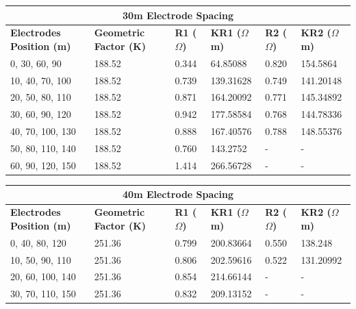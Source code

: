 \documentclass[12pt,a4paper]{report}
\begin{document}
\begin{table}[H]
    \centering
    \begin{adjustbox}{max width=\textwidth}
    \setlength{\tabcolsep}{15pt}
    \renewcommand{\arraystretch}{1.5}
    \begin{tabular}{|p{3.0cm}|p{2.5cm}|p{1.8cm}|p{2.5cm}|p{2cm}|p{3.0cm}|}
    \hline
    \multicolumn{6}{|c|}{\rule{0pt}{2em}\huge\textbf{30m Electrode Spacing}} \\
    \hline
    \textbf{Electrodes Position (m)} & \textbf{Geometric Factor (K)} & \textbf{R1 ($\Omega$)} & \textbf{KR1 ($\Omega$m)} & \textbf{R2 ($\Omega$)} & \textbf{KR2 ($\Omega$m)}  \\ \hline
    0, 30, 60, 90   & 188.52 & 0.344 & 64.85088  & 0.820 & 154.5864  \\ \hline
    10, 40, 70, 100 & 188.52 & 0.739 & 139.31628 & 0.749 & 141.20148 \\ \hline
    20, 50, 80, 110 & 188.52 & 0.871 & 164.20092 & 0.771 & 145.34892 \\ \hline
    30, 60, 90, 120 & 188.52 & 0.942 & 177.58584 & 0.768 & 144.78336 \\ \hline
    40, 70, 100, 130 & 188.52 & 0.888 & 167.40576 & 0.788 & 148.55376 \\ \hline
    50, 80, 110, 140 & 188.52 & 0.760 & 143.2752  & -     & -         \\ \hline
    60, 90, 120, 150 & 188.52 & 1.414 & 266.56728 & -     & -         \\ \hline
    \end{tabular}
\end{adjustbox}
\end{table}

\begin{table}[h!]
    \centering
    \begin{adjustbox}{max width=\textwidth}
    \setlength{\tabcolsep}{15pt}
    \renewcommand{\arraystretch}{1.5}
    \begin{tabular}{|p{3.0cm}|p{2.5cm}|p{1.8cm}|p{2.5cm}|p{2cm}|p{3.0cm}|}
    \hline
    \multicolumn{6}{|c|}{\rule{0pt}{2em}\huge\textbf{40m Electrode Spacing}} \\
    \hline
    \textbf{Electrodes Position (m)} & \textbf{Geometric Factor (K)} & \textbf{R1 ($\Omega$)} & \textbf{KR1 ($\Omega$m)} & \textbf{R2 ($\Omega$)} & \textbf{KR2 ($\Omega$m)}  \\ \hline
    0, 40, 80, 120   & 251.36 & 0.799 & 200.83664 & 0.550 & 138.248   \\ \hline
    10, 50, 90, 110  & 251.36 & 0.806 & 202.59616 & 0.522 & 131.20992 \\ \hline
    20, 60, 100, 140 & 251.36 & 0.854 & 214.66144 & -     & -         \\ \hline
    30, 70, 110, 150 & 251.36 & 0.832 & 209.13152 & -     & -         \\ \hline
    \end{tabular}
\end{adjustbox}
\end{table}
\end{document}
